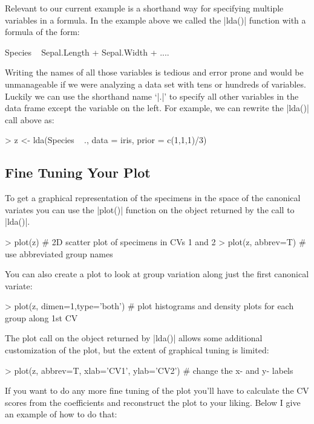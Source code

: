 Relevant to our current example is a shorthand way for specifying multiple variables in a formula. In the example above we called the |lda()| function with a formula of the form:
\begin{R}
Species ~ Sepal.Length + Sepal.Width + ....
\end{R}

Writing the names of all those variables is tedious and error prone and would be unmanageable if we were analyzing a data set with tens or hundreds of variables. Luckily we can use the shorthand name `|.|' to specify all other variables in the data frame except the variable on the left.  For example, we can rewrite the |lda()| call above as:

\begin{R}
> z <- lda(Species ~ ., data = iris, prior = c(1,1,1)/3)
\end{R}

\subsection{Fine Tuning Your Plot}

To get a graphical representation of the specimens in the space of the canonical variates you can use the |plot()| function on the object returned by the call to |lda()|.

\begin{R}
> plot(z) # 2D scatter plot of specimens in CVs 1 and 2
> plot(z, abbrev=T) # use abbreviated group names
\end{R}

You can also create a plot to look at group variation along just the first canonical variate:

\begin{R}
> plot(z, dimen=1,type='both') # plot histograms and density plots for each group along 1st CV
\end{R}


The plot call on the object returned by |lda()| allows some additional customization of the plot, but the extent of graphical tuning is limited:

\begin{R}
> plot(z, abbrev=T, xlab='CV1', ylab='CV2') # change the x- and y- labels
\end{R}

If you want to do any more fine tuning of the plot you'll have to calculate the CV scores from the coefficients and reconstruct the plot to your liking. Below I give an example of how to do that:

